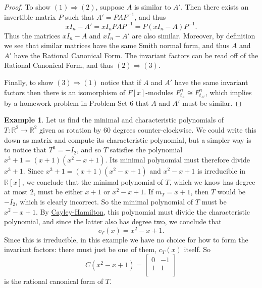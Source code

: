 \documentclass[12pt]{report}
\numberwithin{equation}{section}
\numberwithin{theorem}{chapter}
\theoremstyle{definition}
\newtheorem{example}[theorem]{Example}
\newtheorem*{basic properties}{Basic Properties}
\newtheorem*{Important Remark}{Important Remark}
\newcommand{\R}{\mathbb{R}}
\begin{document}
\begin{proof}
To show $(1)\Rightarrow (2)$, suppose $A$ is similar to $A'$. Then there exists an invertible matrix $P$ such that $A' = PAP^{-1}$, and thus 
$$xI_n-A' = xI_n PAP^{-1} = P(xI_n - A) P^{-1}.$$
Thus the matrices $xI_n-A$ and $xI_n-A'$ are also similar. Moreover, by definition we see that similar matrices have the same Smith normal form, and thus $A$ and $A'$ have the Rational Canonical Form. The invariant factors can be read off of the Rational Canonical Form, and thus $(2)\Rightarrow (3)$.

Finally, to show $(3)\Rightarrow (1)$ notice that if $A$ and $A'$ have the same invariant factors then there is an isomorphism of $F[x]$-modules $F^n_{t_A} \cong F^n_{t_{A'}}$, which implies by a homework problem in Problem Set 6 that $A$ and $A'$ must be similar.
\end{proof}













\begin{example}\label{example rotation 60}
Let us find the minimal and characteristic polynomials of $T: \R^2 \to \R^2$ given as rotation by 60 degrees counter-clockwise. We could write this down as matrix and compute its characteristic polynomial, but a simpler way is to notice that $T^3 = -I_2$, and so $T$ satisfies the polynomial $x^3 + 1 = (x+1)(x^2 - x + 1)$. Its minimal polynomial must therefore divide $x^3 +1$. Since $x^3 +1 = (x+1)(x^2 - x +1)$ and $x^2 - x +1$ is irreducible in $\R[x]$, we conclude that the minimal polynomial of $T$, which we know has degree at most $2$, must be either $x+1$ or $x^2 - x +1$. If $m_T = x+1$, then $T$ would be $-I_2$, which is clearly incorrect. So the minimal polynomial of $T$ must be $x^2 - x +1$. By \hyperref[cayley-hamilton]{Cayley-Hamilton}, this polynomial must divide the characteristic polynomial, and since the latter also has degree two, we conclude that
$$c_T(x) = x^2 - x + 1.$$
Since this is irreducible, in this example we have no choice for how to form the invariant factors: there must just be one of them, $c_T(x)$ itself. So
$$C(x^2 - x + 1) = 
\begin{bmatrix}
0 & -1 \\
1 & 1 \\
\end{bmatrix}$$
is the rational canonical form of $T$. 
\end{example}
\end{document}
